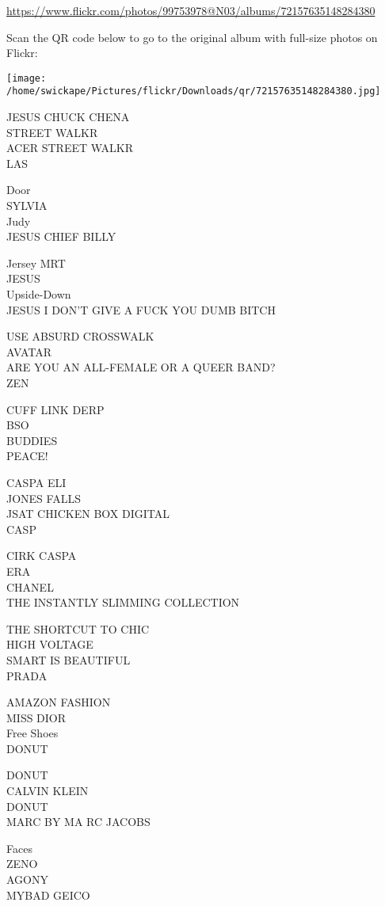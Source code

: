 \documentclass[10pt,letterpaper]{article}
\begin{document}
\url{https://www.flickr.com/photos/99753978@N03/albums/72157635148284380}

Scan the QR code below to go to the original album with full-size photos on Flickr:

\texttt{[image: /home/swickape/Pictures/flickr/Downloads/qr/72157635148284380.jpg]}


JESUS CHUCK CHENA\\
STREET WALKR\\
ACER STREET WALKR\\
LAS

Door\\
SYLVIA\\
Judy\\
JESUS CHIEF BILLY

Jersey MRT\\
JESUS\\
Upside{-}Down\\
JESUS I DON'T GIVE A FUCK YOU DUMB BITCH

USE ABSURD CROSSWALK\\
AVATAR\\
ARE YOU AN ALL{-}FEMALE OR A QUEER BAND?\\
ZEN

CUFF LINK DERP\\
BSO\\
BUDDIES\\
PEACE!

CASPA ELI\\
JONES FALLS\\
JSAT CHICKEN BOX DIGITAL\\
CASP

CIRK CASPA\\
ERA\\
CHANEL\\
THE INSTANTLY SLIMMING COLLECTION

THE SHORTCUT TO CHIC\\
HIGH VOLTAGE\\
SMART IS BEAUTIFUL\\
PRADA

AMAZON FASHION\\
MISS DIOR\\
Free Shoes\\
DONUT

DONUT\\
CALVIN KLEIN\\
DONUT\\
MARC BY MA RC JACOBS

Faces\\
ZENO\\
AGONY\\
MYBAD GEICO
\end{document}
